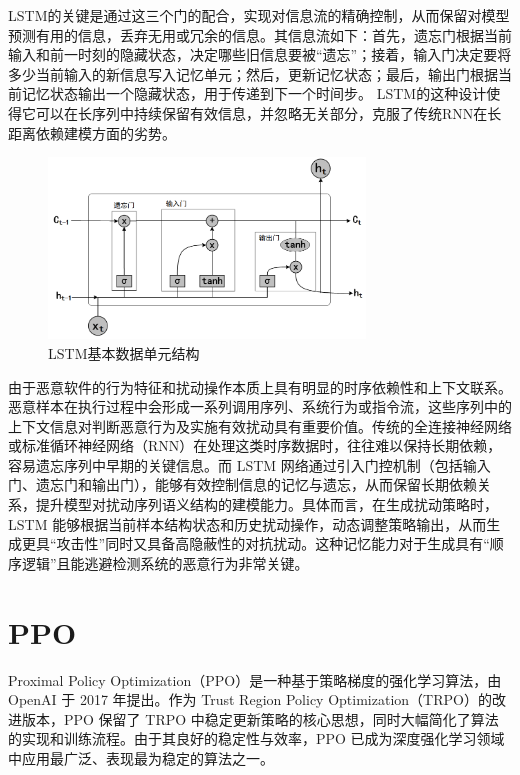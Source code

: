 LSTM的关键是通过这三个门的配合，实现对信息流的精确控制，从而保留对模型预测有用的信息，丢弃无用或冗余的信息。其信息流如下：首先，遗忘门根据当前输入和前一时刻的隐藏状态，决定哪些旧信息要被“遗忘”；接着，输入门决定要将多少当前输入的新信息写入记忆单元；然后，更新记忆状态；最后，输出门根据当前记忆状态输出一个隐藏状态，用于传递到下一个时间步。
LSTM的这种设计使得它可以在长序列中持续保留有效信息，并忽略无关部分，克服了传统RNN在长距离依赖建模方面的劣势。

\begin{figure}[hbt]
	\centering
	\includegraphics[width=0.75\textwidth]{figures/2.5}
	\caption{LSTM基本数据单元结构}\label{fig:2.5}
\end{figure}

由于恶意软件的行为特征和扰动操作本质上具有明显的时序依赖性和上下文联系。恶意样本在执行过程中会形成一系列调用序列、系统行为或指令流，这些序列中的上下文信息对判断恶意行为及实施有效扰动具有重要价值。传统的全连接神经网络或标准循环神经网络（RNN）在处理这类时序数据时，往往难以保持长期依赖，容易遗忘序列中早期的关键信息。而 LSTM 网络通过引入门控机制（包括输入门、遗忘门和输出门），能够有效控制信息的记忆与遗忘，从而保留长期依赖关系，提升模型对扰动序列语义结构的建模能力。具体而言，在生成扰动策略时，LSTM 能够根据当前样本结构状态和历史扰动操作，动态调整策略输出，从而生成更具“攻击性”同时又具备高隐蔽性的对抗扰动。这种记忆能力对于生成具有“顺序逻辑”且能逃避检测系统的恶意行为非常关键。

\section{PPO}

Proximal Policy Optimization（PPO）\cite{yu2022surprising}是一种基于策略梯度的强化学习算法，由 OpenAI 于 2017 年提出。作为 Trust Region Policy Optimization（TRPO）的改进版本，PPO 保留了 TRPO 中稳定更新策略的核心思想，同时大幅简化了算法的实现和训练流程。由于其良好的稳定性与效率，PPO 已成为深度强化学习领域中应用最广泛、表现最为稳定的算法之一。

